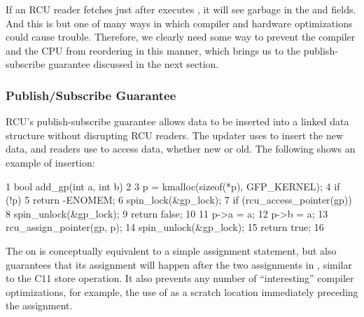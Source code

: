 If an RCU reader fetches  just after 
executes \clnref{}, %
it will see garbage in the  and  fields.
And this is but one of many ways in which compiler and hardware
optimizations could cause trouble.
Therefore, we clearly need some way
to prevent the compiler and the CPU from reordering in this manner,
which brings us to the publish-subscribe guarantee discussed in the next
section.

\subsubsection{Publish/Subscribe Guarantee}

RCU's publish-subscribe guarantee allows data to be inserted into a
linked data structure without disrupting RCU readers.
The updater uses
 to insert the new data, and readers use
 to access data, whether new or old.
The following
shows an example of insertion:

\begin{VerbatimN}
       1 bool add_gp(int a, int b)
       2 {
       3   p = kmalloc(sizeof(*p), GFP_KERNEL);
       4   if (!p)
       5     return -ENOMEM;
       6   spin_lock(&gp_lock);
       7   if (rcu_access_pointer(gp)) {
       8     spin_unlock(&gp_lock);
       9     return false;
      10   }
      11   p->a = a;
      12   p->b = a;
      13   rcu_assign_pointer(gp, p);
      14   spin_unlock(&gp_lock);
      15   return true;
      16 }
\end{VerbatimN}

The  on \clnref{} %
is conceptually equivalent to a
simple assignment statement, but also guarantees that its assignment
will happen after the two assignments in \clnref{,}, %
similar to the
C11  store operation.
It also prevents any
number of ``interesting'' compiler optimizations, for example, the use of
 as a scratch location immediately preceding the assignment.

\QuickQuizEnd

